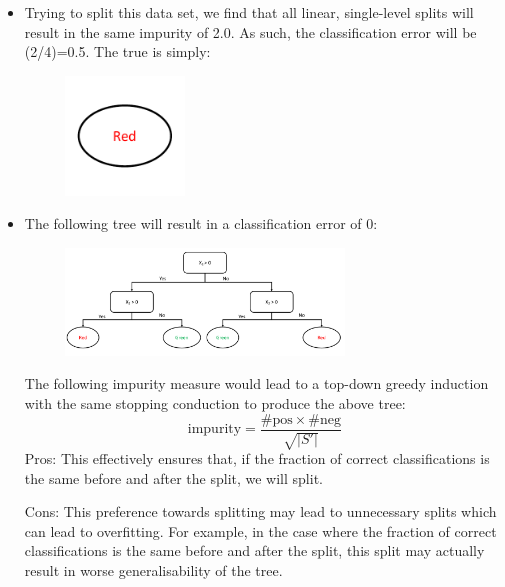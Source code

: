 \begin{solution}
    \begin{itemize}
        \item Trying to split this data set, we find that all linear, single-level splits will result in the same impurity of 2.0. As such, the classification error will be (2/4)=0.5. The true is simply: 
        \begin{figure}[H]
           \begin{center}
           \includegraphics[width=0.3\textwidth]{Tree_1Ci.pdf}
           \end{center}
           \end{figure}
        \item The following tree will result in a classification error of 0:
        \begin{figure}[H]
            \begin{center}
            \includegraphics[width=0.7\textwidth]{Tree_1Cii.pdf}
            \end{center}
            \end{figure}
        The following impurity measure would lead to a top-down greedy induction with the same stopping conduction to produce the above tree:
        \begin{equation}
            \text{impurity} = \frac{\#\text{pos}\times\#\text{neg}}{\sqrt{|S'|}}
        \end{equation}
        Pros: This effectively ensures that, if the fraction of correct classifications is the same before and after the split, we will split. 

        Cons: This preference towards splitting may lead to unnecessary splits which can lead to overfitting. For example, in the case where the fraction of correct classifications is the same before and after the split, this split may actually result in worse generalisability of the tree.


\end{itemize}
\end{solution}
